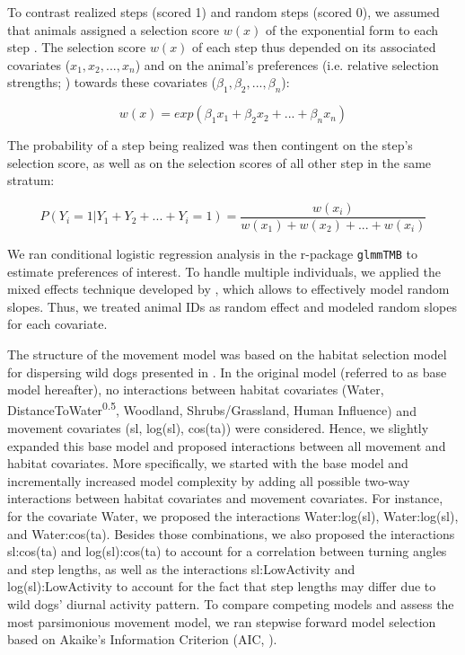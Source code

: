 \documentclass[abstract=on,10pt,a4paper,bibliography=totocnumbered]{article}
\begin{document}
To contrast realized steps (scored 1) and random steps (scored 0), we assumed
that animals assigned a selection score \(w(x)\) of the exponential form to each
step \citep{Fortin.2005}. The selection score \(w(x)\) of each step thus
depended on its associated covariates (\(x_1, x_2, ..., x_n\)) and on the
animal's preferences (i.e. relative selection strengths; \citealp{Avgar.2017})
towards these covariates (\(\beta_1, \beta_2, ..., \beta_n\)):

\begin{equation}
\label{EQ1}
  w(x) = exp(\beta_1 x_1 + \beta_2 x_2 + ... + \beta_n x_n)
\end{equation}

The probability of a step being realized was then contingent on the step's
selection score, as well as on the selection scores of all other step in the
same stratum:

\begin{equation}
\label{EQ2}
  P(Y_{i} = 1 | Y_{1} + Y_{2} + ... + Y_{i} = 1) =
  \frac{w(x_{i})}{w(x_{1}) + w(x_{2}) + ... + w(x_{i})}
\end{equation}

We ran conditional logistic regression analysis in the r-package {\tt glmmTMB}
to estimate preferences of interest. To handle multiple individuals, we applied
the mixed effects technique developed by \citep{Muff.2020}, which allows to
effectively model random slopes. Thus, we treated animal IDs as random effect
and modeled random slopes for each covariate.

The structure of the movement model was based on the habitat selection model for
dispersing wild dogs presented in \cite{Hofmann.2021}. In the original model
(referred to as base model hereafter), no interactions between habitat
covariates (\textsf{Water, DistanceToWater\textsuperscript{0.5}, Woodland,
Shrubs/Grassland, Human Influence}) and movement covariates (\textsf{sl,
log(sl), cos(ta)}) were considered. Hence, we slightly expanded this base model
and proposed interactions between all movement and habitat covariates. More
specifically, we started with the base model and incrementally increased model
complexity by adding all possible two-way interactions between habitat
covariates and movement covariates. For instance, for the covariate
\textsf{Water}, we proposed the interactions \textsf{Water:log(sl)},
\textsf{Water:log(sl)}, and \textsf{Water:cos(ta)}. Besides those combinations,
we also proposed the interactions \textsf{sl:cos(ta)} and
\textsf{log(sl):cos(ta)} to account for a correlation between turning angles and
step lengths, as well as the interactions \textsf{sl:LowActivity} and
\textsf{log(sl):LowActivity} to account for the fact that step lengths may
differ due to wild dogs' diurnal activity pattern. To compare competing models
and assess the most parsimonious movement model, we ran stepwise forward model
selection based on Akaike's Information Criterion (AIC, \citealp{Burnham.2002}).
\end{document}
